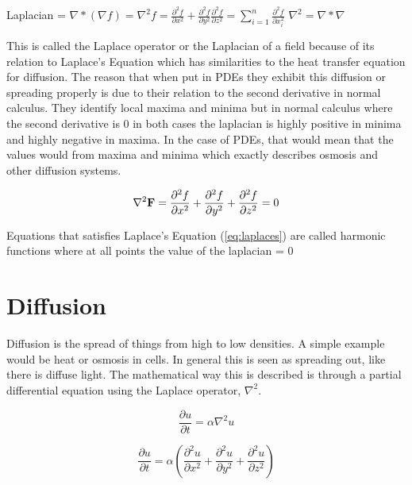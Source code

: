 \documentclass[12pt, letterpaper]{article}
\begin{document}
\begin{center}
Laplacian = $\nabla * (\nabla f) = \nabla^2 f = \frac{\partial^2 f}{\partial x^2} + \frac{\partial^2
f}{\partial y^2} \frac{\partial^2 f}{\partial z^2} = \sum_{i=1}^{n} \frac{\partial^2 f}{\partial x_i^2}$ \quad
$\nabla^2 = \nabla * \nabla$
\end{center}

This is called the Laplace operator or the Laplacian of a field because of its relation to Laplace's
Equation which has similarities to the heat transfer equation for diffusion. The reason that when put in
PDEs they exhibit this diffusion or spreading properly is due to their relation to the second derivative in
normal calculus. They identify local maxima and minima but in normal calculus where the second derivative is
0 in both cases the laplacian is highly positive in minima and highly negative in maxima. In the case of
PDEs, that would mean that the values would  from maxima and  minima which exactly
describes osmosis and other diffusion systems.

\begin{equation}
  \nabla^2 \bold{F} = \frac{\partial^2 f}{\partial x^2} + \frac{\partial^2 f}{\partial y^2} +
  \frac{\partial^2 f}{\partial z^2} = 0
  \label{eq:laplaces}
\end{equation}

Equations that satisfies Laplace's Equation (\ref{eq:laplaces}) are called harmonic functions where at all points the value of
the laplacian = 0 

\section{Diffusion}

Diffusion is the spread of things from high to low densities. A simple example would be heat or osmosis in 
cells. In general this is seen as spreading out, like there is diffuse light. The mathematical way this is
described is through a partial differential equation using the Laplace operator, $ \nabla^2 $.

\begin{equation}
  \frac{\partial u}{\partial t} = \alpha \nabla^2 u
  \label{eq:heatDiff}
\end{equation}

\begin{equation}
  \frac{\partial u}{\partial t} = \alpha (\frac{\partial^2 u}{\partial x^2} + \frac{\partial^2 u}{\partial
  y^2} + \frac{\partial^2 u}{\partial z^2})
  \label{eq:heatDiff3}
\end{equation}
\end{document}
